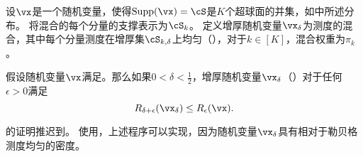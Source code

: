 \documentclass[../../book-main_zh.tex]{subfiles}
\begin{document}
\begin{definition}\label{def:thickening-rv-uos}
    设$\vx$是一个随机变量，使得$\Supp(\vx) = \cS$是$K$个超球面的并集，如中所述分布。
    将混合的每个分量的支撑表示为$\cS_k$。
    定义增厚随机变量$\vx_{\delta}$为测度的混合，其中每个分量测度在增厚集$\cS_{k, \delta}$上均匀（），对于$k \in [K]$，混合权重为$\pi_k$。
\end{definition}


\begin{lemma}\label{lem:rate-distortion-lb-uos}
    假设随机变量$\vx$满足。那么如果$0 < \delta < \tfrac{1}{2}$，增厚随机变量$\vx_{\delta}$（）对于任何$\epsilon > 0$满足
    \begin{equation}
        R_{\delta + \epsilon}(\vx_{\delta})
        \leq
        R_{\epsilon}(\vx).
    \end{equation}
\end{lemma}

的证明推迟到。
使用，上述程序可以实现，因为随机变量$\vx_{\delta}$具有相对于勒贝格测度均匀的密度。
\end{document}
